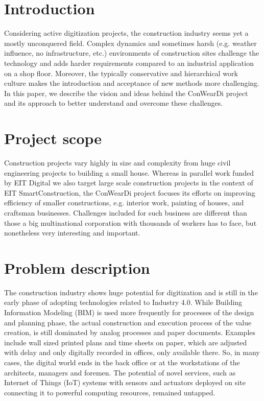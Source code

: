 \section{Introduction}
Considering active digitization projects, the construction industry seems yet a mostly unconquered field.
Complex dynamics and sometimes harsh (e.g. weather influence, no infrastructure, etc.) environments of construction sites challenge the technology and adds harder requirements compared to an industrial application on a shop floor. 
Moreover, the typically conservative and hierarchical work culture makes the introduction and acceptance of new methods more challenging. In this paper, we describe the vision and ideas behind the ConWearDi project and its approach to better understand and overcome these challenges.

\section{Project scope}
Construction projects vary highly in size and complexity from huge civil engineering projects to building a small house. 
Whereas in parallel work funded by EIT Digital we also target large scale construction projects in the context of EIT SmartConstruction, the ConWearDi project focuses its efforts on improving efficiency of smaller constructions, e.g. interior work, painting of houses, and craftsman businesses.
Challenges included for such business are different than those a big multinational corporation with thousands of workers has to face, but nonetheless very interesting and important.

\section{Problem description}
The construction industry shows huge potential for digitization and is still in the early phase of adopting technologies related to Industry 4.0. 
While Building Information Modeling (BIM) is used more frequently for processes of the design and planning phase, the actual construction and execution process of the value creation, is still dominated by analog processes and paper documents. 
Examples include wall sized printed plans and time sheets on paper, which are adjusted with delay and only digitally recorded in offices, only available there. 
So, in many cases, the digital world ends in the back office or at the workstations of the architects, managers and foremen. 
The potential of novel services, such as Internet of Things (IoT) systems with sensors and actuators deployed on site connecting it to powerful computing resources, remained untapped.

